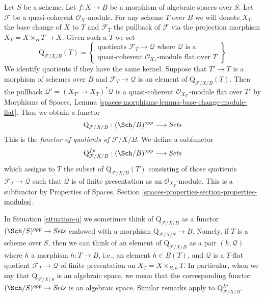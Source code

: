 \begin{situation}
\label{situation-q}
Let $S$ be a scheme. Let $f : X \to B$ be a morphism of algebraic spaces
over $S$. Let $\mathcal{F}$ be a quasi-coherent $\mathcal{O}_X$-module.
For any scheme $T$ over $B$ we will denote $X_T$ the base change of
$X$ to $T$ and $\mathcal{F}_T$ the pullback
of $\mathcal{F}$ via the projection morphism $X_T = X \times_B T \to X$.
Given such a $T$ we set
$$
\text{Q}_{\mathcal{F}/X/B}(T) =
\left\{
\begin{matrix}
\text{quotients }\mathcal{F}_T \to \mathcal{Q}\text{ where }
\mathcal{Q}\text{ is a}\\
\text{quasi-coherent }
\mathcal{O}_{X_T}\text{-module flat over }T
\end{matrix}
\right\}
$$
We identify quotients if they have the same kernel. Suppose
that $T' \to T$ is a morphism of schemes over $B$ and
$\mathcal{F}_T \to \mathcal{Q}$ is an element of
$\text{Q}_{\mathcal{F}/X/B}(T)$. Then the pullback
$\mathcal{Q}' = (X_{T'} \to X_T)^*\mathcal{Q}$ is a quasi-coherent
$\mathcal{O}_{X_{T'}}$-module flat over $T'$ by
Morphisms of Spaces, Lemma
\ref{spaces-morphisms-lemma-base-change-module-flat}.
Thus we obtain a functor
\begin{equation}
\label{equation-q}
\text{Q}_{\mathcal{F}/X/B} : (\Sch/B)^{opp} \longrightarrow \textit{Sets}
\end{equation}
This is the {\it functor of quotients of $\mathcal{F}/X/B$}.
We define a subfunctor
\begin{equation}
\label{equation-q-fp}
\text{Q}^{fp}_{\mathcal{F}/X/B} : (\Sch/B)^{opp} \longrightarrow \textit{Sets}
\end{equation}
which assigns to $T$ the subset of $\text{Q}_{\mathcal{F}/X/B}(T)$
consisting of those quotients $\mathcal{F}_T \to \mathcal{Q}$
such that $\mathcal{Q}$ is of finite presentation as an
$\mathcal{O}_{X_T}$-module. This is a subfunctor by
Properties of Spaces, Section
\ref{spaces-properties-section-properties-modules}.
\end{situation}

\noindent
In Situation \ref{situation-q} we sometimes think of
$\text{Q}_{\mathcal{F}/X/B}$ as a functor
$(\Sch/S)^{opp} \to \textit{Sets}$ endowed
with a morphism $\text{Q}_{\mathcal{F}/X/S} \to B$.
Namely, if $T$ is a scheme over $S$, then we can think of an element
of $\text{Q}_{\mathcal{F}/X/B}$ as a pair $(h, \mathcal{Q})$
where $h$ a morphism $h : T \to B$, i.e., an element $h \in B(T)$,
and $\mathcal{Q}$ is a $T$-flat quotient $\mathcal{F}_T \to \mathcal{Q}$
of finite presentation on $X_T = X \times_{B, h} T$. In particular, when we say
that $\text{Q}_{\mathcal{F}/X/S}$ is an algebraic space, we mean that the
corresponding functor $(\Sch/S)^{opp} \to \textit{Sets}$ is an algebraic space.
Similar remarks apply to $\text{Q}^{fp}_{\mathcal{F}/X/B}$.

